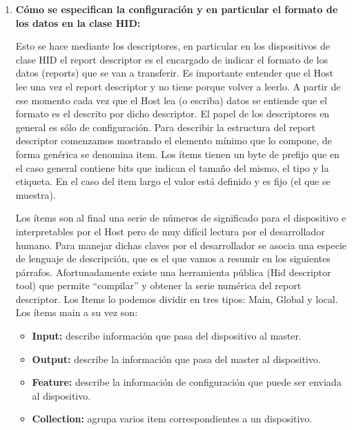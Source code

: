 \documentclass[a4paper, 11pt]{article}
\begin{document}
\begin{enumerate}
    \item \textbf{Cómo se especifican la configuración y en particular el
        formato de los datos en la clase HID:}

        Esto se hace mediante los descriptores, en particular en los
        dispositivos de clase HID el report descriptor es el encargado de
        indicar el formato de los datos (reports) que se van a transferir. Es
        importante entender que el Host lee una vez el report descriptor y no
        tiene porque volver a leerlo. A partir de ese momento cada vez que el
        Host lea (o escriba) datos se entiende que el formato es el descrito
        por dicho descriptor. El papel de los descriptores en general es sólo
        de configuración.  Para describir la estructura del report descriptor
        comenzamos mostrando el elemento mínimo que lo compone, de forma
        genérica se denomina item. Los ítems tienen un byte de prefijo que en
        el caso general contiene bits que indican el tamaño del mismo, el tipo
        y la etiqueta. En el caso del item largo el valor está definido y es
        fijo (el que se muestra).

        Los ítems son al final una serie de números de significado para el
        dispositivo e interpretables por el Host pero de muy difícil lectura
        por el desarrollador humano. Para manejar dichas claves por el
        desarrollador se asocia una especie de lenguaje de descripción, que es
        el que vamos a resumir en los siguientes párrafos.  Afortunadamente
        existe una herramienta pública (Hid descriptor tool) que permite
        “compilar” y obtener la serie numérica del report descriptor. Los Items
        lo podemos dividir en tres tipos: Main, Global y local.  Los ítems main
        a su vez son:

        \begin{itemize}
            \item \textbf{Input:} describe información que pasa del dispositivo al
                master.

            \item \textbf{Output:} describe la información que pasa del master al
                dispositivo.

            \item \textbf{Feature:} describe la información de configuración que puede
                ser enviada al dispositivo.

            \item \textbf{Collection:} agrupa varios item correspondientes a un
                dispositivo.


\end{itemize}
\end{enumerate}
\end{document}
